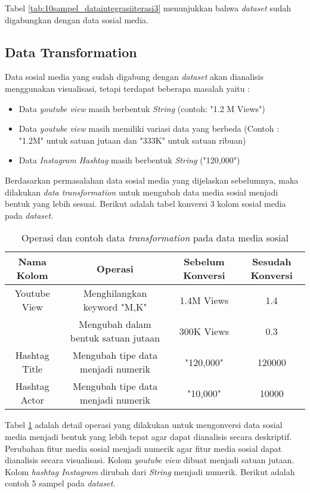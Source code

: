Tabel \ref{tab:10sampel_dataintegrasiiterasi3} menunjukkan bahwa \textit{dataset} sudah digabungkan dengan data sosial media.

\subsection{Data Transformation} 
Data sosial media yang sudah digabung dengan \textit{dataset} akan dianalisis menggunakan visualisasi, tetapi terdapat beberapa masalah yaitu  :

\begin{itemize}
\item Data \textit{youtube view} masih berbentuk \textit{String} (contoh: "1.2 M Views")
\item Data \textit{youtube view} masih memiliki variasi data yang berbeda (Contoh : "1.2M" untuk satuan jutaan dan "333K" untuk satuan ribuan)
\item Data \textit{Instagram Hashtag} masih berbentuk \textit{String} ("120,000") 
\end{itemize}

Berdasarkan permasalahan data sosial media yang dijelaskan sebelumnya, maka dilakukan \textit{data transformation} untuk mengubah data media sosial menjadi bentuk yang lebih sesuai. Berikut adalah tabel konversi 3 kolom sosial media pada \textit{dataset}. 

\begin{table}[H]
\caption{Operasi dan contoh data \textit{transformation} pada data media sosial}
\centering
\begin{tabular}{|c|c|c|c|}
\hline 
Nama Kolom & Operasi & Sebelum Konversi &  Sesudah Konversi \\ 
\hline 
Youtube View & Menghilangkan keyword "M,K" & 1.4M Views & 1.4 \\ 

 & Mengubah dalam bentuk satuan jutaan & 300K Views & 0.3 \\ 
\hline 
Hashtag Title  & Mengubah tipe data menjadi numerik & "120,000" & 120000 \\ 
\hline 
Hashtag Actor & Mengubah tipe data menjadi numerik & "10,000" & 10000 \\ 
\hline 
\end{tabular} 
\label{tab:operasi_datatransformation_iterasi3}
\end{table}




Tabel \ref{tab:operasi_datatransformation_iterasi3} adalah detail operasi yang dilakukan untuk mengonversi data sosial media menjadi bentuk yang lebih tepat agar dapat dianalisis secara deskriptif. Perubahan fitur media sosial menjadi numerik agar fitur media sosial dapat dianalisis secara visualisasi. Kolom \textit{youtube view} dibuat menjadi satuan jutaan. Kolom \textit{hashtag Instagram} dirubah dari \textit{String} menjadi numerik. Berikut adalah contoh 5 sampel pada \textit{dataset}.

